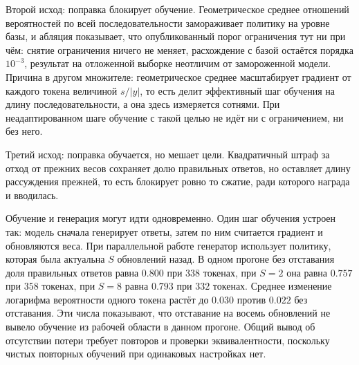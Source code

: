 \documentclass[11pt]{article}
\begin{document}
Второй исход: поправка блокирует обучение. Геометрическое среднее отношений вероятностей по всей последовательности замораживает политику на уровне базы, и абляция показывает, что опубликованный порог ограничения тут ни при чём: снятие ограничения ничего не меняет, расхождение с базой остаётся порядка $10^{-3}$, результат на отложенной выборке неотличим от замороженной модели. Причина в другом множителе: геометрическое среднее масштабирует градиент от каждого токена величиной $s/|y|$, то есть делит эффективный шаг обучения на длину последовательности, а она здесь измеряется сотнями. При неадаптированном шаге обучение с такой целью не идёт ни с ограничением, ни без него.

Третий исход: поправка обучается, но мешает цели. Квадратичный штраф за отход от прежних весов сохраняет долю правильных ответов, но оставляет длину рассуждения прежней, то есть блокирует ровно то сжатие, ради которого награда и вводилась.

Обучение и генерация могут идти одновременно. Один шаг обучения устроен так: модель сначала генерирует ответы, затем по ним считается градиент и обновляются веса. При параллельной работе генератор использует политику, которая была актуальна $S$ обновлений назад. В одном прогоне без отставания доля правильных ответов равна $0.800$ при $338$ токенах, при $S=2$ она равна $0.757$ при $358$ токенах, при $S=8$ равна $0.793$ при $332$ токенах. Среднее изменение логарифма вероятности одного токена растёт до $0.030$ против $0.022$ без отставания. Эти числа показывают, что отставание на восемь обновлений не вывело обучение из рабочей области в данном прогоне. Общий вывод об отсутствии потери требует повторов и проверки эквивалентности, поскольку чистых повторных обучений при одинаковых настройках нет.
\end{document}

